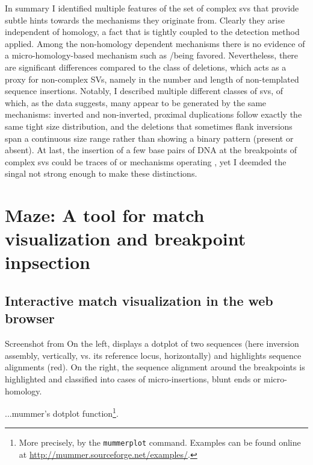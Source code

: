 In summary I identified multiple features of the set of complex \acp{sv} that
provide subtle hints towards the mechanisms they originate from. Clearly they
arise independent of homology, a fact that is tightly coupled to the detection
method applied. Among the non-homology dependent mechanisms there is no evidence
of a micro-homology-based mechanism such as \fostes/\mmbir being favored.
Nevertheless, there are significant differences compared to the class of
deletions, which acts as a proxy for non-complex SVs, namely in the number and
length of non-templated sequence insertions. Notably, I described multiple
different classes of \acp{sv}, of which, as the data suggests, many appear to be
generated by the same mechanisms: inverted and non-inverted, proximal
duplications follow exactly the same tight size distribution, and the deletions
that sometimes flank inversions span a continuous size range rather than showing
a binary pattern (present or absent). At last, the insertion of a few base pairs
of DNA at the breakpoints of complex \acp{sv} could be traces of \nhej or \bir
mechanisms operating \citep{Hastings2009,Carvalho2016}, yet I deemded the singal
not strong enough to make these distinctions.





\section{Maze: A tool for match visualization and breakpoint inpsection}
\label{sec:maze}


\subsection{Interactive match visualization in the web browser}
\label{sec:maze_dotplot}


    {Screenshot from \maze}
    {On the left, \maze displays a dotplot of two sequences (here inversion
    assembly, vertically, vs. its reference locus, horizontally) and highlights
    sequence alignments (red). On the right, the sequence alignment around the
    breakpoints is highlighted and classified into cases of micro-insertions,
    blunt ends or micro-homology.}



...\acs{mummer}'s dotplot function\footnote{More precisely, by the \texttt{mummerplot} command.
Examples can be found online at \url{http://mummer.sourceforge.net/examples/}.}.



